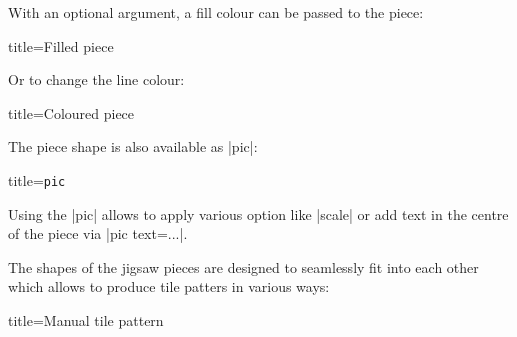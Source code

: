 \documentclass{scrartcl}
\begin{document}
With an optional argument, a fill colour can be passed to the piece:

\begin{tcblisting}{title={Filled piece}}
\end{tcblisting}

Or to change the line colour:

\begin{tcblisting}{title={Coloured piece}}
\end{tcblisting}

The piece shape is also available as \TikZ \saminline|pic|:

\begin{tcblisting}{title={\texttt{pic}}}
\end{tcblisting}

Using the \TikZ \saminline|pic| allows to apply various \TikZ option like \saminline|scale| or add text in the centre of the piece via \saminline|pic text={...}|.

The shapes of the jigsaw pieces are designed to seamlessly fit into each other which allows to produce tile patters in various ways:

\begin{tcblisting}{title={Manual tile pattern}}
\end{tcblisting}
\end{document}

